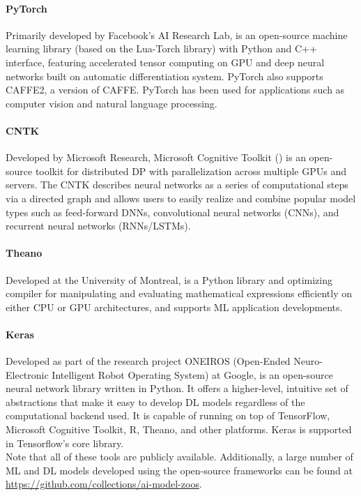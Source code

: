 \paragraph{PyTorch} %
Primarily developed by Facebook's AI Research Lab,  is an open-source machine learning library (based on the Lua-Torch library) with Python and C++ interface, featuring accelerated tensor computing on GPU and deep neural networks built on automatic differentiation system. PyTorch also supports CAFFE2, a version of CAFFE. PyTorch has been used for applications such as computer vision and natural language processing. 

\paragraph{CNTK} 
Developed by Microsoft Research, Microsoft Cognitive Toolkit () is an open-source toolkit for distributed DP with parallelization across multiple GPUs and servers. The CNTK describes neural networks as a series of computational steps via a directed graph and allows users to easily realize and combine popular model types such as feed-forward DNNs, convolutional neural networks (CNNs), and recurrent neural networks (RNNs/LSTMs).

\paragraph{Theano} %
Developed at the University of Montreal,  is a Python library and optimizing compiler for manipulating and evaluating mathematical expressions efficiently on either CPU or GPU architectures, and supports ML application developments. 

\paragraph{Keras} %
Developed as part of the research project ONEIROS (Open-Ended Neuro-Electronic Intelligent Robot Operating System) at Google,  is an open-source neural network library written in Python. It offers a higher-level, intuitive set of abstractions that make it easy to develop DL models regardless of the computational backend used. It is capable of running on top of TensorFlow, Microsoft Cognitive Toolkit, R, Theano, and other platforms. Keras is supported in Tensorflow's core library. 
\\
    \vspace{2mm}
Note that all of these tools are publicly available. Additionally, a large number of ML and DL models developed using the open-source frameworks can be found at \url{https://github.com/collections/ai-model-zoos}.

